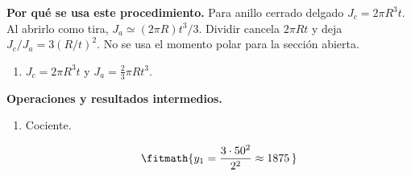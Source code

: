 \noindent\textbf{Por qué se usa este procedimiento.} Para anillo cerrado delgado $J_c=2\pi R^3t$. Al abrirlo como tira, $J_a\simeq(2\pi R)t^3/3$. Dividir cancela $2\pi Rt$ y deja $J_c/J_a=3(R/t)^2$. No se usa el momento polar para la sección abierta.

\begin{enumerate}

\item $J_c = 2\pi R^3 t$ y $J_a = \tfrac{2}{3}\pi R t^3$.

\end{enumerate}

\noindent\textbf{Operaciones y resultados intermedios.}

\begin{enumerate}

\item Cociente.

\[\fitmath{y_{1}=\frac{3\cdot {50}^{2}}{{2}^{2}}\approx 1875\,}\]

\end{enumerate}
